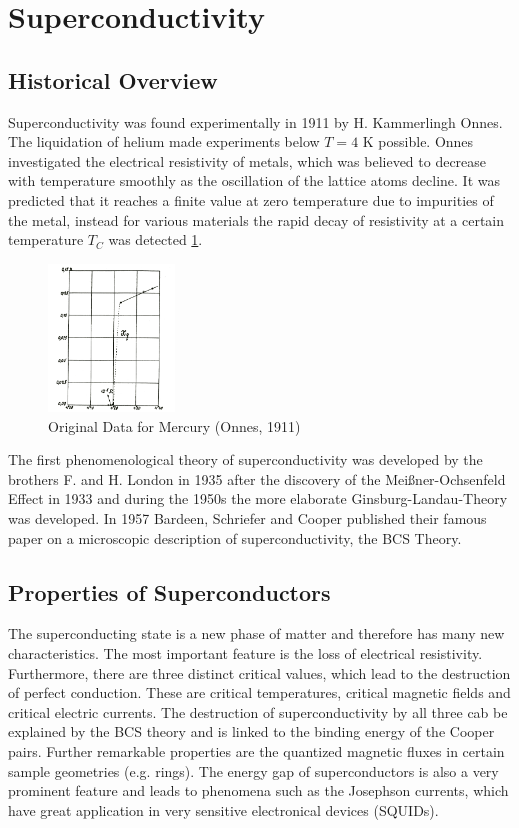 \documentclass[a4paper]{scrartcl}
\numberwithin{equation}{section}
\numberwithin{figure}{section}
\numberwithin{table}{section}
\begin{document}
\section*{Superconductivity}
\small
\subsection*{Historical Overview}
Superconductivity was found experimentally in 1911 by H. Kammerlingh Onnes. The liquidation of helium made experiments below $T=4$ K possible. Onnes investigated the electrical resistivity of metals, which was believed to decrease with temperature smoothly as the oscillation of the lattice atoms decline. It was predicted that it reaches a finite value at zero temperature due to impurities of the metal, instead for various materials the rapid decay of resistivity at a certain temperature $T_C$ was detected \ref{fig:onnes}. 

\begin{figure}
\includegraphics[width=0.3\textwidth]{img/heikemess.png}
\caption{\small Original Data for Mercury (Onnes, 1911) \cite{onnes}}
\label{fig:onnes}
\end{figure}

The first phenomenological theory of superconductivity was developed by the brothers F. and H. London in 1935 after the discovery of the Meißner-Ochsenfeld Effect in 1933 and during the 1950s the more elaborate Ginsburg-Landau-Theory was developed. In 1957 Bardeen, Schriefer and Cooper published their famous paper on a microscopic description of superconductivity, the BCS Theory.

\subsection*{Properties of Superconductors}
The superconducting state is a new phase of matter and therefore has many new characteristics. The most important feature is the loss of electrical resistivity. Furthermore, there are three distinct critical values, which lead to the destruction of perfect conduction. These are critical temperatures, critical magnetic fields and critical electric currents. The destruction of superconductivity by all three cab be explained by the BCS theory and is linked to the binding energy of the Cooper pairs. Further remarkable properties are the quantized magnetic fluxes in certain sample geometries (e.g. rings). The energy gap of superconductors is also a very prominent feature and leads to phenomena such as the Josephson currents, which have great application in very sensitive electronical devices (SQUIDs). 
\end{document}
